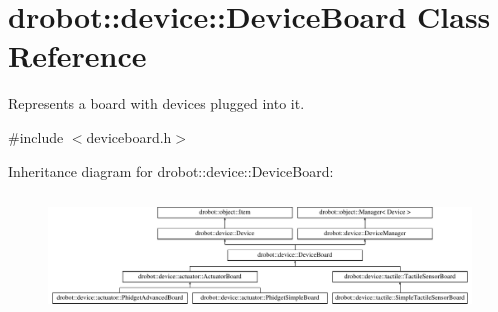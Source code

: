 \hypertarget{classdrobot_1_1device_1_1DeviceBoard}{\section{drobot\-:\-:device\-:\-:Device\-Board Class Reference}
\label{classdrobot_1_1device_1_1DeviceBoard}
}


Represents a board with devices plugged into it.  




{\ttfamily \#include $<$deviceboard.\-h$>$}

Inheritance diagram for drobot\-:\-:device\-:\-:Device\-Board\-:\begin{figure}[H]
\begin{center}
\leavevmode
\includegraphics[height=3.185438cm]{classdrobot_1_1device_1_1DeviceBoard}
\end{center}
\end{figure}
